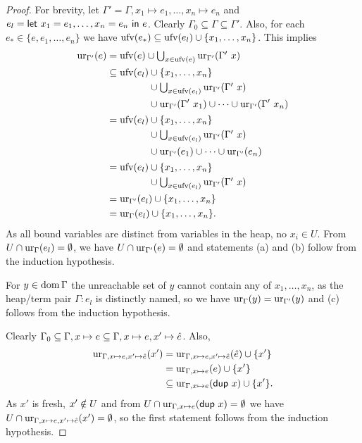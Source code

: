 \documentclass[preprint]{sigplanconf}
\theoremstyle{nonumberplain}
\newtheorem{proof}{Proof}
\begin{document}
\begin{proof}
For brevity, let $\Gamma' = \Gamma,x_1\mapsto e_1,\ldots,x_n\mapsto e_n$ and $e_{l} = \text{\textsf{let}}\ x_1=e_1,\ldots,x_n=e_n\ \text{\textsf{in}}\ e$.
Clearly $\Gamma_0 \subseteq \Gamma \subseteq \Gamma'$.
Also, for each $e_* \in \{e,e_1,\ldots,e_n\}$ we have $\text{ufv}(e_*) \subseteq \text{ufv}(e_l) \cup \{x_1,\ldots,x_n\}$. This implies 
{\allowdisplaybreaks[1]
\begin{align*}
\ur{\Gamma'}e
&= \ufv e \cup \textstyle\bigcup_{x\in \ufv e}\ur{\Gamma'}{\Gamma'\ x} \\
&\subseteq 
\begin{aligned}[t]
\ufv {e_l} &\cup \{x_1,\ldots,x_n\}\\
&\cup \textstyle\bigcup_{x\in \ufv {e_l}}\ur{\Gamma'}{\Gamma'\ x} \\
&\cup \ur{\Gamma'}{\Gamma'\ x_1} \cup \cdots \cup \ur{\Gamma'}{\Gamma'\ x_n}
\end{aligned}\\
&=
\begin{aligned}[t]
\ufv {e_l} &\cup \{x_1,\ldots,x_n\}\\
&\cup \textstyle\bigcup_{x\in \ufv {e_l}}\ur{\Gamma'}{\Gamma'\ x}\\
&\cup \ur{\Gamma'}{e_1} \cup \cdots \cup \ur{\Gamma'}{e_n}
\end{aligned}\\
&= 
\begin{aligned}[t]
\ufv {e_l} &\cup \{x_1,\ldots,x_n\} \\
&\cup \textstyle\bigcup_{x\in \ufv {e_l}}\ur{\Gamma'}{\Gamma'\ x}
\end{aligned}\\
&= \ur{\Gamma'} {e_l} \cup \{x_1,\ldots,x_n\}\\
&= \ur{\Gamma} {e_l} \cup \{x_1,\ldots,x_n\}.
\end{align*}
}
As all bound variables are distinct from variables in the heap, no $x_i\in U$. From $U\cap \text{ur}_{\Gamma}(e_l)
= \emptyset$, we have $U \cap \text{ur}_{\Gamma'}(e) = \emptyset$ and statements (a) and (b) follow from the induction hypothesis.

For $y\in \text{dom}\,\Gamma$ the unreachable set of $y$ cannot contain any of $x_1,\ldots,x_n$, as the heap/term pair $\Gamma : e_l$ is distinctly named, so we have $\text{ur}_{\Gamma}(y) = \text{ur}_{\Gamma'}(y)$ and (c) follows from the induction hypothesis.

Clearly $\Gamma_0 \subseteq \Gamma, x\mapsto e \subseteq \Gamma, x\mapsto e, x' \mapsto \hat e$. Also,
\begin{align*}
\text{ur}_{\Gamma,x\mapsto e, x'\mapsto \hat e}(x')
&= \text{ur}_{\Gamma, x\mapsto e, x'\mapsto \hat e}(\hat e) \cup \{x'\}\\
&= \text{ur}_{\Gamma, x\mapsto e}(e) \cup \{x'\}\\
&\subseteq \text{ur}_{\Gamma, x\mapsto e}(\text{\textsf{dup}}\ x) \cup \{x'\}.
\end{align*}
As $x'$ is fresh, $x'\notin U$ and from $U \cap \text{ur}_{\Gamma, x\mapsto e}(\text{\textsf{dup}}\ x)= \emptyset$ we have $U \cap \text{ur}_{\Gamma,x\mapsto e, x' \mapsto \hat e}(x')=\emptyset$, so the first statement follows from the induction hypothesis.


\end{proof}
\end{document}
